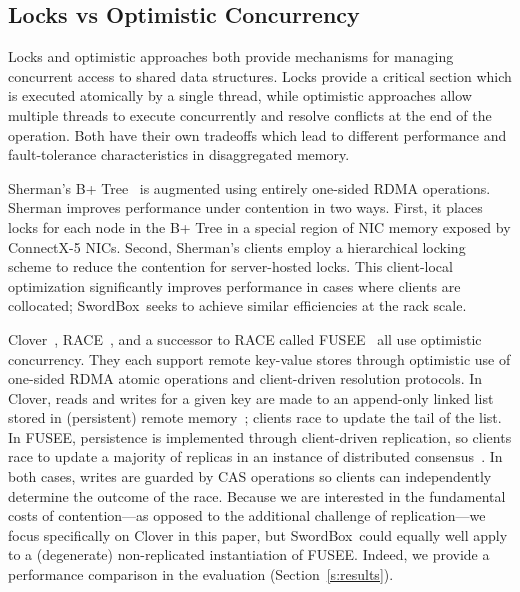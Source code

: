 \documentclass[12pt]{ucsddissertation}
\newcommand{\sword}{SwordBox}
\begin{document}
\subsection{Locks vs Optimistic Concurrency}
\label{sec:lock-vs-op}

Locks and optimistic approaches both provide mechanisms for managing concurrent access to shared
data structures. Locks provide a critical section which is executed atomically by a single thread,
while optimistic approaches allow multiple threads to execute concurrently and resolve conflicts at
the end of the operation. Both have their own tradeoffs which lead to different performance and
fault-tolerance characteristics in disaggregated memory.

Sherman's B+ Tree~\cite{sherman} is augmented using entirely one-sided RDMA
operations. Sherman improves performance under contention in two ways. First, it places locks for
each node in the B+ Tree in a special region of NIC memory exposed by ConnectX-5 NICs. 
Second, Sherman's clients employ a hierarchical locking scheme to reduce the contention for
server-hosted locks. This client-local optimization significantly improves performance in cases
where clients are collocated; \sword\ seeks to achieve similar efficiencies at the rack scale.

Clover~\cite{clover}, RACE~\cite{race}, and a successor to RACE
called FUSEE~\cite{fusee} all use optimistic concurrency. They each support remote key-value stores
through optimistic use of one-sided RDMA atomic operations and client-driven resolution protocols.
In Clover, reads and writes for a given key are made to an append-only linked list stored in
(persistent) remote memory~\cite{clover}; clients race to update the tail of the list. In FUSEE,
persistence is implemented through client-driven replication, so clients race to update a majority
of replicas in an instance of distributed consensus~\cite{fusee}. In both cases, writes are guarded
by CAS operations so clients can independently determine the outcome of the race. Because we are
interested in the fundamental costs of contention—as opposed to the additional challenge of
replication—we focus specifically on Clover in this paper, but \sword\ could equally well apply to a
(degenerate) non-replicated instantiation of FUSEE. Indeed, we provide a performance comparison in
the evaluation (Section~\ref{s:results}).
\end{document}
